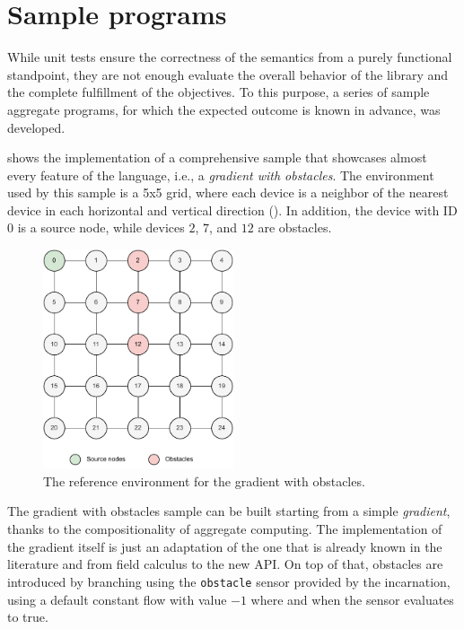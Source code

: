 \section{Sample programs}

While unit tests ensure the correctness of the semantics from a purely functional standpoint, they are not enough evaluate the overall behavior of the library and the complete fulfillment of the objectives.
%
To this purpose, a series of sample aggregate programs, for which the expected outcome is known in advance, was developed.

 shows the implementation of a comprehensive sample that showcases almost every feature of the language, i.e., a \textit{gradient with obstacles}.
%
The environment used by this sample is a 5x5 grid, where each device is a neighbor of the nearest device in each horizontal and vertical direction ().
%
In addition, the device with ID $0$ is a source node, while devices $2$, $7$, and $12$ are obstacles.
%
\begin{figure}
    \centering
    \includegraphics[width=0.5\textwidth]{figures/samples/gradient-environment.pdf}
    \caption{The reference environment for the gradient with obstacles.}
    \label{fig:gradient-environment}
\end{figure}
%


The gradient with obstacles sample can be built starting from a simple \textit{gradient}, thanks to the compositionality of aggregate computing.
%
The implementation of the gradient itself is just an adaptation of the one that is already known in the literature and from field calculus to the new API.
%
On top of that, obstacles are introduced by branching using the \texttt{obstacle} sensor provided by the incarnation, using a default constant flow with value $-1$ where and when the sensor evaluates to true.

